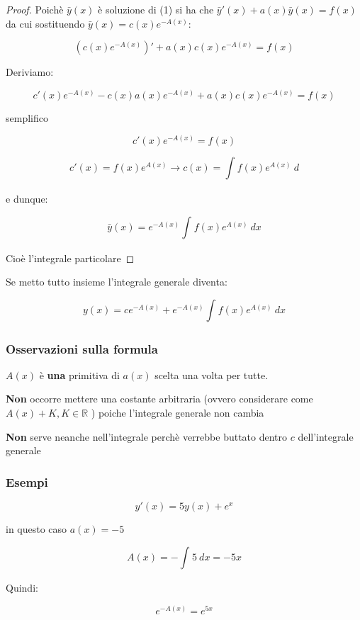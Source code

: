 \documentclass[11pt]{article}
\begin{document}
\begin{proof}
    Poichè $\bar y(x)$ è soluzione di (1) si ha che $\bar y'(x)+a(x) \bar y(x)=f(x)$ da cui sostituendo $\bar y(x) = c(x) e ^{-A(x)}$:

    \[
        (c(x) e ^{-A(x)})'+ a(x) c(x) e ^{-A(x)} = f(x)
    \]
    
    Deriviamo:

    \[
        c'(x) e ^{-A(x)} - c(x) a(x) e ^{-A(x)} + a(x) c(x) e ^{-A(x)}= f(x)
    \]
    
    semplifico

    \[
        c'(x) e ^{-A(x)} = f(x)
    \]

    \[
        c'(x) = f(x) e ^{A(x)} \rightarrow c(x) = \int_{{}}^{{}} {f(x) e ^{A(x)}} \: d{} {}
    \]

    e dunque:

    \[
        \bar y(x) = e ^{-A(x)} \int_{{}}^{{}} {f(x) e ^{A(x)}} \: d{x} {}
    \]

    Cioè l'integrale particolare
\end{proof}

Se metto tutto insieme l'integrale generale diventa:

\[
    y(x) = c e ^{-A(x)} + e ^{-A(x)} \int_{{}}^{{}} {f(x) e ^{A(x)}} \: d{x} {}
\]

\subsubsection{Osservazioni sulla formula}

$A(x)$ è \textbf{una} primitiva di $a(x)$ scelta una volta per tutte.

\textbf{Non} occorre mettere una costante arbitraria (ovvero considerare come $A(x) + K,K \in \mathbb{R}$ ) poiche l'integrale generale non cambia

\textbf{Non} serve neanche nell'integrale perchè verrebbe buttato dentro $c$ dell'integrale generale


\subsubsection{Esempi}

\[
    y'(x) = 5y(x) + e ^{x}
\]

in questo caso $a(x) = -5$

\[
    A(x) = - \int_{{}}^{{}} {5} \: d{x} {}=-5x
\]

Quindi: 

\[
    e ^{-A(x)}=e ^{5x}
\]
\end{document}
